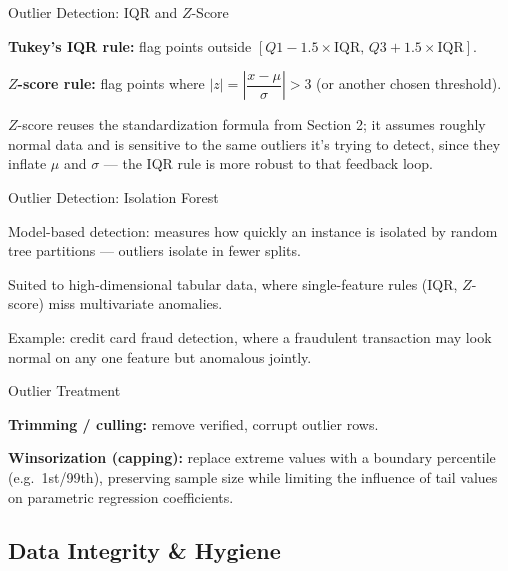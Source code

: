 \begin{frame}{Outlier Detection: IQR and $Z$-Score}
    \begin{sitemize}
        \item \textbf{Tukey's IQR rule:} flag points outside $[Q1 - 1.5 \times \text{IQR}, \, Q3 + 1.5 \times \text{IQR}]$.
        \item \textbf{$Z$-score rule:} flag points where $|z| = \left|\dfrac{x - \mu}{\sigma}\right| > 3$ (or another chosen threshold).
        \item $Z$-score reuses the standardization formula from Section 2; it assumes roughly normal data and is sensitive to the same outliers it's trying to detect, since they inflate $\mu$ and $\sigma$ — the IQR rule is more robust to that feedback loop.
    \end{sitemize}
\end{frame}


\begin{frame}{Outlier Detection: Isolation Forest}
    \begin{sitemize}
        \item Model-based detection: measures how quickly an instance is isolated by random tree partitions — outliers isolate in fewer splits.
        \item Suited to high-dimensional tabular data, where single-feature rules (IQR, $Z$-score) miss multivariate anomalies.
        \item Example: credit card fraud detection, where a fraudulent transaction may look normal on any one feature but anomalous jointly.
    \end{sitemize}
\end{frame}


\begin{frame}{Outlier Treatment}
    \begin{sitemize}
        \item \textbf{Trimming / culling:} remove verified, corrupt outlier rows.
        \item \textbf{Winsorization (capping):} replace extreme values with a boundary percentile (e.g.\ 1st/99th), preserving sample size while limiting the influence of tail values on parametric regression coefficients.
    \end{sitemize}
\end{frame}


\subsection{Data Integrity \& Hygiene}


